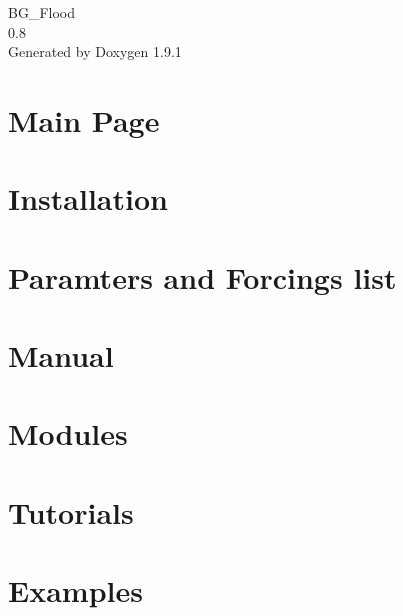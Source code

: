 \let\mypdfximage\pdfximage\def\pdfximage{\immediate\mypdfximage}\documentclass[twoside]{book}
\newcommand{\+}{\discretionary{\mbox{\scriptsize$\hookleftarrow$}}{}{}}
\newcommand{\clearemptydoublepage}{%
  \newpage{\pagestyle{empty}\cleardoublepage}%
}
\begin{document}
\raggedbottom

\hypersetup{pageanchor=false,
             bookmarksnumbered=true,
             pdfencoding=unicode
            }
\begin{titlepage}
\vspace*{7cm}
\begin{center}%
{\Large BG\+\_\+\+Flood \\[1ex]\large 0.\+8 }\\
\vspace*{1cm}
{\large Generated by Doxygen 1.9.1}\\
\end{center}
\end{titlepage}
\clearemptydoublepage
{}
\tableofcontents
\clearemptydoublepage
{}
\hypersetup{pageanchor=true}

\chapter{Main Page}
\label{index}\hypertarget{index}{}
\chapter{Installation}
\label{How_to_install}

\chapter{Paramters and Forcings list}
\label{ParameterList}

\chapter{Manual}
\label{Manual}

\chapter{Modules}
\label{Modules}

\chapter{Tutorials}
\label{Tutorials}

\chapter{Examples}
\label{Test-and-Examples}

\end{document}
